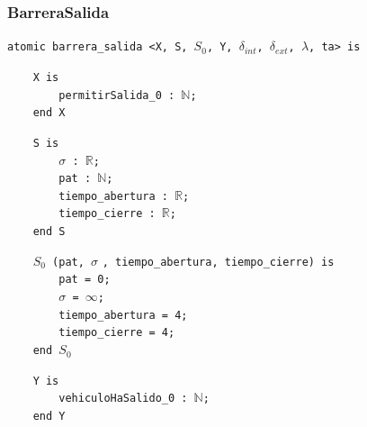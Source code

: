 \documentclass[12pt]{article}
\begin{document}
\subsubsection{BarreraSalida}

\begin{tcolorbox}[
    colback=black!5!white,
    colframe=black!80!white,
    boxrule=0.8pt,
    arc=2pt,
    left=5pt,
    right=5pt,
    top=5pt,
    bottom=5pt,
    fontupper=\ttfamily,
    breakable
]
\begin{flushleft}
\texttt{atomic barrera\_salida <X, S, $S_0$, Y, }$\delta_{int}$\texttt{, }$\delta_{ext}$\texttt{, }$\lambda$\texttt{, ta> is}
\end{flushleft}

\begin{flushleft}
\texttt{~~~~X is} \\
\texttt{~~~~~~~~permitirSalida\_0 : }\(\mathbb{N}\)\texttt{;} \\
\texttt{~~~~end X}
\end{flushleft}

\begin{flushleft}
\texttt{~~~~S is} \\
\texttt{~~~~~~~~}$\sigma$\texttt{ : }\(\mathbb{R}\)\texttt{;} \\
\texttt{~~~~~~~~pat : }\(\mathbb{N}\)\texttt{;} \\
\texttt{~~~~~~~~tiempo\_abertura : }\(\mathbb{R}\)\texttt{;} \\
\texttt{~~~~~~~~tiempo\_cierre : }\(\mathbb{R}\)\texttt{;} \\
\texttt{~~~~end S}
\end{flushleft}

\begin{flushleft}
\texttt{~~~~$S_0$ (pat, }$\sigma$ \texttt{, tiempo\_abertura, tiempo\_cierre) is} \\
\texttt{~~~~~~~~pat = 0;} \\
\texttt{~~~~~~~~}$\sigma$\texttt{ = }$\infty$\texttt{;} \\
\texttt{~~~~~~~~tiempo\_abertura = 4;} \\
\texttt{~~~~~~~~tiempo\_cierre = 4;} \\
\texttt{~~~~end }$S_0$
\end{flushleft}

\begin{flushleft}
\texttt{~~~~Y is} \\
\texttt{~~~~~~~~vehiculoHaSalido\_0 : }\(\mathbb{N}\)\texttt{;} \\
\texttt{~~~~end Y}
\end{flushleft}


\end{tcolorbox}
\end{document}

